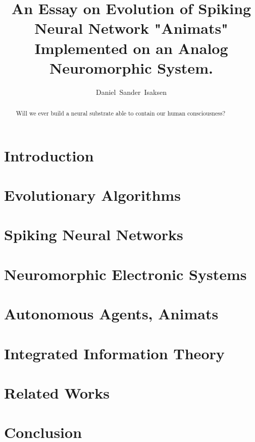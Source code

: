 \documentclass[UKenglish]{ifimaster}
\title{An Essay on Evolution of Spiking Neural Network "Animats" Implemented on an Analog Neuromorphic System.}
\author{Daniel~Sander~Isaksen}%
\begin{document}
\maketitle

\begin{abstract}
Will we ever build a neural substrate able to contain our human consciousness?
\end{abstract}

\tableofcontents{}

\chapter{Introduction}\label{sect:intro}


\chapter{Evolutionary Algorithms}\label{sect:ea}


\chapter{Spiking Neural Networks}\label{sect:snn}


\chapter{Neuromorphic Electronic Systems}\label{sect:neuromorphic}


\chapter{Autonomous Agents, Animats}\label{sect:agent}


\chapter{Integrated Information Theory}\label{sect:iit}


\chapter{Related Works}


\chapter{Conclusion}


\printbibliography
\end{document}
